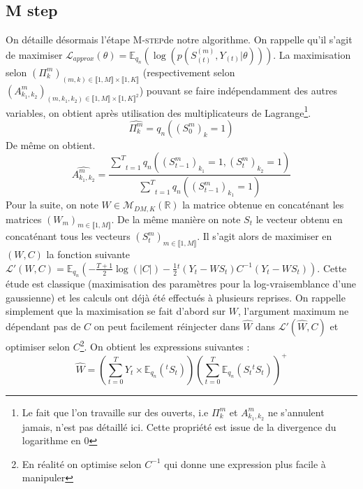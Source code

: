 \documentclass[10pt,a4paper]{article}
\newcommand{\Mstep}{\textsc{M-step}}
\begin{document}
\subsection{M step}
On détaille désormais l'étape \Mstep de notre algorithme. On rappelle qu'il s'agit de maximiser $\mathcal{L}_{approx}(\theta)=\mathbb{E}_{q_n}\left( \log \left( p(S_{(t)}^{(m)},Y_{(t)}\vert \theta)\right)\right)$. La maximisation selon $(\Pi_{k}^m)_{(m,k) \in \llbracket 1,M \rrbracket \times \llbracket 1,K \rrbracket}$ (respectivement selon $(A_{k_1,k_2}^m)_{(m,k_1,k_2) \in \llbracket 1,M \rrbracket \times \llbracket 1,K \rrbracket^2}$) pouvant se faire indépendamment des autres variables, on obtient après utilisation des multiplicateurs de Lagrange\footnote{Le fait que l'on travaille sur des ouverts, i.e $\Pi_{k}^m$ et $A_{k_1,k_2}^m$ ne s'annulent jamais, n'est pas détaillé ici. Cette propriété est issue de la divergence du logarithme en $0$}.
\begin{equation}
\widehat{\Pi_k^m}=q_{n}((S_0^m)_k=1)
\end{equation}
De même on obtient.
\begin{equation}
\widehat{A_{k_1,k_2}^m}=\frac{\underset{t=1}{\overset{T}{\sum}}q_n((S_{t-1}^m)_{k_1}=1,(S_t^m)_{k_2}=1)}{\underset{t=1}{\overset{T}{\sum}}q_n((S_{t-1}^m)_{k_1}=1)}
\end{equation}
Pour la suite, on note $W \in \mathcal{M}_{DM,K}(\mathbb{R})$ la matrice obtenue en concaténant les matrices $(W_m)_{m \in \llbracket 1,M \rrbracket}$. De la même manière on note $S_t$ le vecteur obtenu en concaténant tous les vecteurs $(S_t^m)_{m \in \llbracket 1,M \rrbracket}$. Il s'agit alors de maximiser en $(W,C)$ la fonction suivante $\mathcal{L}'(W,C)=\mathbb{E}_{q_n}\left(-\frac{T+1}{2} \log(\vert C \vert) -\frac{1}{2} {}^t\left(Y_t-WS_t \right)C^{-1} \left( Y_t-WS_t\right)\right)$. Cette étude est classique (maximisation des paramètres pour la log-vraisemblance d'une gaussienne) et les calculs ont déjà été effectués à plusieurs reprises. On rappelle simplement que la maximisation se fait d'abord sur $W$, l'argument maximum ne dépendant pas de $C$ on peut facilement réinjecter dans $\widehat{W}$ dans $\mathcal{L}'(\widehat{W},C)$ et optimiser selon $C$\footnote{En réalité on optimise selon $C^{-1}$ qui donne une expression plus facile à manipuler}. On obtient les expressions suivantes :
\begin{equation}
\widehat{W}=\left( \underset{t=0}{\overset{T}{\sum}} Y_t \times \mathbb{E}_{q_n}({}^tS_t) \right) \left( \underset{t=0}{\overset{T}{\sum}} \mathbb{E}_{q_n}\left( S_t {}^t S_t\right)\right)^+
\end{equation}
\end{document}

